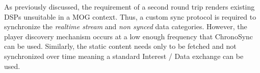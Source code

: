 As previously discussed, the requirement of a second round trip renders existing DSPs unsuitable in a MOG context. Thus, a custom sync protocol is required to synchronize the \textit{realtime stream} and \textit{non synced} data categories. However, the player discovery mechanism occurs at a low enough frequency that ChronoSync can be used. Similarly, the static content needs only to be fetched and not synchronized over time meaning a standard Interest / Data exchange can be used.  





















